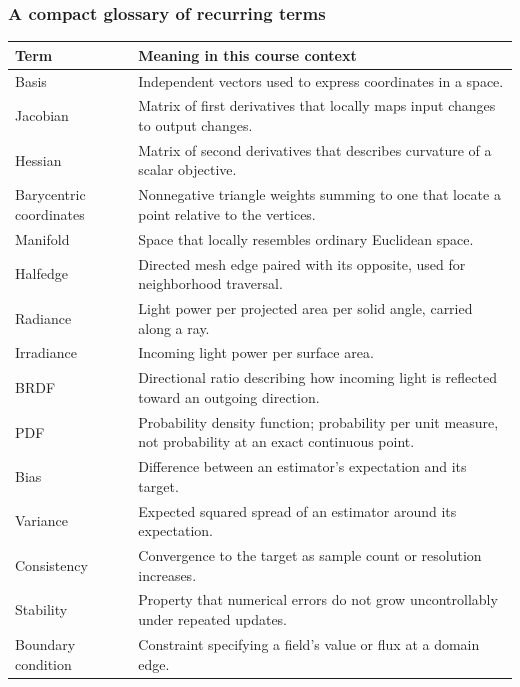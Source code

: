 \subsubsection{A compact glossary of recurring terms}\label{03-visual-computing-i-ch001-a-compact-glossary-of-recurring-terms}

\hypertarget{03-visual-computing-i-ch001-a-compact-glossary-of-recurring-terms}{}

{\def\LTcaptype{none} %
\begin{longtable}[]{@{}
  >{\raggedright\arraybackslash}p{}
  >{\raggedright\arraybackslash}p{}@{}}
\toprule\noalign{}
\begin{minipage}[b]{\linewidth}\raggedright
Term
\end{minipage} & \begin{minipage}[b]{\linewidth}\raggedright
Meaning in this course context
\end{minipage} \\
\midrule\noalign{}
\endhead
\bottomrule\noalign{}
\endlastfoot
Basis & Independent vectors used to express coordinates in a space. \\
Jacobian & Matrix of first derivatives that locally maps input changes to output changes. \\
Hessian & Matrix of second derivatives that describes curvature of a scalar objective. \\
Barycentric coordinates & Nonnegative triangle weights summing to one that locate a point relative to the vertices. \\
Manifold & Space that locally resembles ordinary Euclidean space. \\
Halfedge & Directed mesh edge paired with its opposite, used for neighborhood traversal. \\
Radiance & Light power per projected area per solid angle, carried along a ray. \\
Irradiance & Incoming light power per surface area. \\
BRDF & Directional ratio describing how incoming light is reflected toward an outgoing direction. \\
PDF & Probability density function; probability per unit measure, not probability at an exact continuous point. \\
Bias & Difference between an estimator's expectation and its target. \\
Variance & Expected squared spread of an estimator around its expectation. \\
Consistency & Convergence to the target as sample count or resolution increases. \\
Stability & Property that numerical errors do not grow uncontrollably under repeated updates. \\
Boundary condition & Constraint specifying a field's value or flux at a domain edge. \\
\end{longtable}
}

